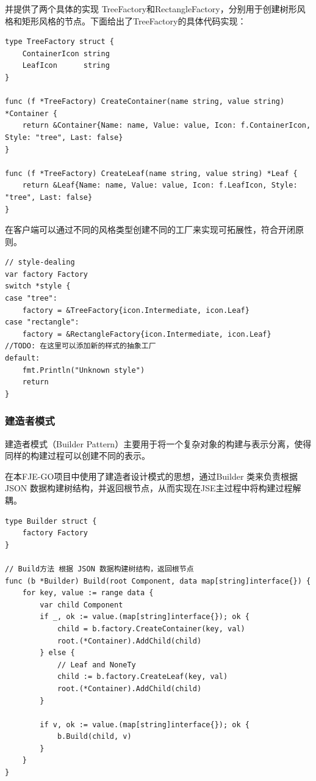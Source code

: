 \documentclass[hyperref,a4paper,UTF8]{ctexart}
\begin{document}
并提供了两个具体的实现 TreeFactory和RectangleFactory，分别用于创建树形风格和矩形风格的节点。下面给出了TreeFactory的具体代码实现：

\begin{lstlisting}
type TreeFactory struct {
	ContainerIcon string
	LeafIcon      string
}

func (f *TreeFactory) CreateContainer(name string, value string) *Container {
	return &Container{Name: name, Value: value, Icon: f.ContainerIcon, Style: "tree", Last: false}
}

func (f *TreeFactory) CreateLeaf(name string, value string) *Leaf {
	return &Leaf{Name: name, Value: value, Icon: f.LeafIcon, Style: "tree", Last: false}
}
\end{lstlisting}

在客户端可以通过不同的风格类型创建不同的工厂来实现可拓展性，符合开闭原则。
\begin{lstlisting}
// style-dealing
var factory Factory
switch *style {
case "tree":
    factory = &TreeFactory{icon.Intermediate, icon.Leaf}
case "rectangle":
    factory = &RectangleFactory{icon.Intermediate, icon.Leaf}
//TODO: 在这里可以添加新的样式的抽象工厂
default:
    fmt.Println("Unknown style")
    return
}
\end{lstlisting}

\subsubsection{建造者模式}

建造者模式（Builder Pattern）主要用于将一个复杂对象的构建与表示分离，使得同样的构建过程可以创建不同的表示。

在本FJE-GO项目中使用了建造者设计模式的思想，通过Builder 类来负责根据 JSON 数据构建树结构，并返回根节点，从而实现在JSE主过程中将构建过程解耦。

\begin{lstlisting}
type Builder struct {
	factory Factory
}

// Build方法 根据 JSON 数据构建树结构，返回根节点
func (b *Builder) Build(root Component, data map[string]interface{}) {
	for key, value := range data {
		var child Component
		if _, ok := value.(map[string]interface{}); ok {
			child = b.factory.CreateContainer(key, val)
			root.(*Container).AddChild(child)
		} else {
			// Leaf and NoneTy
			child := b.factory.CreateLeaf(key, val)
			root.(*Container).AddChild(child)
		}

		if v, ok := value.(map[string]interface{}); ok {
			b.Build(child, v)
		}
	}
}
\end{lstlisting}
\end{document}
